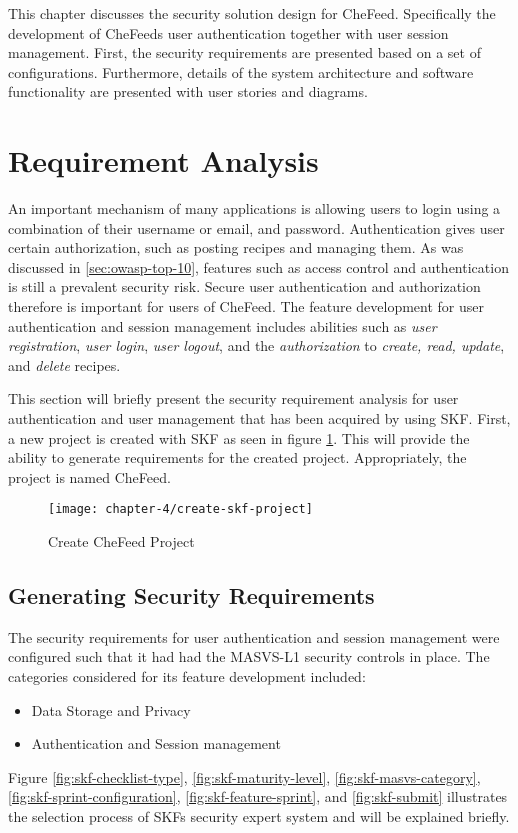 This chapter discusses the security solution design for CheFeed. Specifically the development of CheFeeds user authentication together with user session management. First, the security requirements are presented based on a set of configurations. Furthermore, details of the system architecture and software functionality are presented with user stories and diagrams. 

\section{Requirement Analysis}
An important mechanism of many applications is allowing users to login using a combination of their username or email, and password. Authentication gives user certain authorization, such as posting recipes and managing them. As was discussed in \ref{sec:owasp-top-10}, features such as access control and authentication is still a prevalent security risk. Secure user authentication and authorization therefore is important for users of CheFeed. The feature development for user authentication and session management includes abilities such as \emph{user registration}, \emph{user login}, \emph{user logout}, and the \emph{authorization} to \emph{create, read, update}, and \emph{delete} recipes.

This section will briefly present the security requirement analysis for user authentication and user management that has been acquired by using SKF. First, a new project is created with SKF as seen in figure \ref{fig:chefeed-project}. This will provide the ability to generate requirements for the created project. Appropriately, the project is named CheFeed.

\begin{figure}
    \texttt{[image: chapter-4/create-skf-project]}
    \caption{Create CheFeed Project}
    \label{fig:chefeed-project}
\end{figure}

\subsection{Generating Security Requirements}
The security requirements for user authentication and session management were configured such that it had had the MASVS-L1 security controls in place. The categories considered for its feature development included:
\begin{itemize}
    \item Data Storage and Privacy
    \item Authentication and Session management
\end{itemize}
Figure \ref{fig:skf-checklist-type}, \ref{fig:skf-maturity-level}, \ref{fig:skf-masvs-category}, \ref{fig:skf-sprint-configuration}, \ref{fig:skf-feature-sprint}, and \ref{fig:skf-submit} illustrates the selection process of SKFs security expert system and will be explained briefly.

